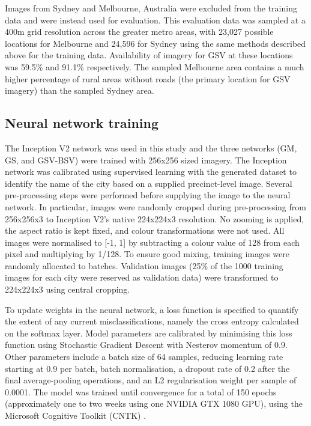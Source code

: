 \documentclass[10pt,letterpaper,hidelinks]{article}
\begin{document}

Images from Sydney and Melbourne, Australia were excluded from the training data and were instead used for evaluation. This evaluation data was sampled at a 400m grid resolution across the greater metro areas, with 23,027 possible locations for Melbourne and 24,596 for Sydney using the same methods described above for the training data. Availability of imagery for GSV at these locations was 59.5\% and 91.1\% respectively. The sampled Melbourne area contains a much higher percentage of rural areas without roads (the primary location for GSV imagery) than the sampled Sydney area.


\subsection*{Neural network training}\label{sec:methods4}    

The Inception V2 network was used in this study and the three networks (GM, GS, and GSV-BSV) were trained with 256x256 sized imagery. The Inception network was calibrated using supervised learning with the generated dataset to identify the name of the city based on a supplied precinct-level image. Several pre-processing steps were performed before supplying the image to the neural network. In particular, images were randomly cropped during pre-processing from 256x256x3 to Inception V2's native 224x224x3 resolution. No zooming is applied, the aspect ratio is kept fixed, and colour transformations were not used. All images were normalised to [-1, 1] by subtracting a colour value of 128 from each pixel and multiplying by 1/128. To ensure good mixing, training images were randomly allocated to batches. Validation images (25\% of the 1000 training images for each city were reserved as validation data) were transformed to 224x224x3 using central cropping.


To update weights in the neural network, a loss function is specified to quantify the extent of any current misclassifications, namely the cross entropy calculated on the softmax layer. Model parameters are calibrated by minimising this loss function using Stochastic Gradient Descent with Nesterov momentum of 0.9. Other parameters include a batch size of 64 samples, reducing learning rate starting at 0.9 per batch, batch normalisation, a dropout rate of 0.2 after the final average-pooling operations, and an L2 regularisation weight per sample of 0.0001. 
The model was trained until convergence for a total of 150 epochs (approximately one to two weeks using one NVIDIA GTX 1080 GPU), using the Microsoft Cognitive Toolkit (CNTK) \cite{Yu2015}. 
\end{document}
